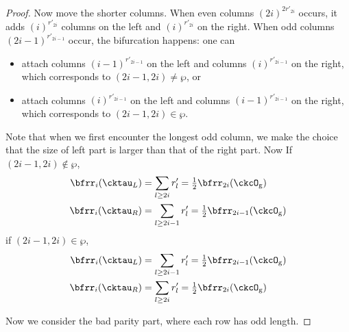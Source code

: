 \documentclass[12pt,a4paper]{amsart}
\def\abs#1{\left|{#1}\right|}
\newcommand{\sgn}{\operatorname{sgn}}
\numberwithin{equation}{section}
\theoremstyle{remark}
\def\half{{\tfrac{1}{2}}}
\begin{document}
\begin{proof}
{      Now move the shorter columns. When even columns $(2i)^{2r'_{2i}}$
      occurs, it adds $(i)^{r'_{2i}}$ columns on the left and $(i)^{r'_{2i}}$ on
      the right. When odd columns $(2i-1)^{r'_{2i-1}}$ occur, the bifurcation
      happens: one can
      \begin{itemize}
        \item attach columns $(i-1)^{r'_{2i-1}}$ on the left and columns
              $(i)^{r'_{2i-1}}$ on the right, which corresponds to
              $(2i-1,2i)\neq \wp$, or
        \item attach columns $(i)^{r'_{2i-1}}$ on the left and columns
              $(i-1)^{r'_{2i-1}}$ on the right, which corresponds to
              $(2i-1,2i)\in \wp$.
      \end{itemize}
      Note that when we first encounter the longest odd column, we make the
      choice that the size of left part is larger than that of the right part.
      Now If $(2i-1,2i)\notin \wp$,
      \[
        \begin{split}
          \bfrr_{i}(\cktau_{L}) & = \sum_{l\geq 2i} r'_{l}
          = \half\bfrr_{2i}(\ckcO_{\mathrm g})\\
          \bfrr_{i}(\cktau_{R}) & = \sum_{l\geq 2i-1} r'_{l} = \half\bfrr_{2i-1}(\ckcO_{\mathrm g})
        \end{split}
      \]
      if $(2i-1,2i)\in \wp$,
      \[
        \begin{split}
          \bfrr_{i}(\cktau_{L}) & = \sum_{l\geq 2i-1} r'_{l}
          = \half\bfrr_{2i-1}(\ckcO_{\mathrm g})\\
          \bfrr_{i}(\cktau_{R}) & = \sum_{l\geq 2i} r'_{l} = \half\bfrr_{2i}(\ckcO_{\mathrm g})
        \end{split}
      \]
    }


    Now we consider the bad parity part, where each row has
    odd length.




\end{proof}
\end{document}
